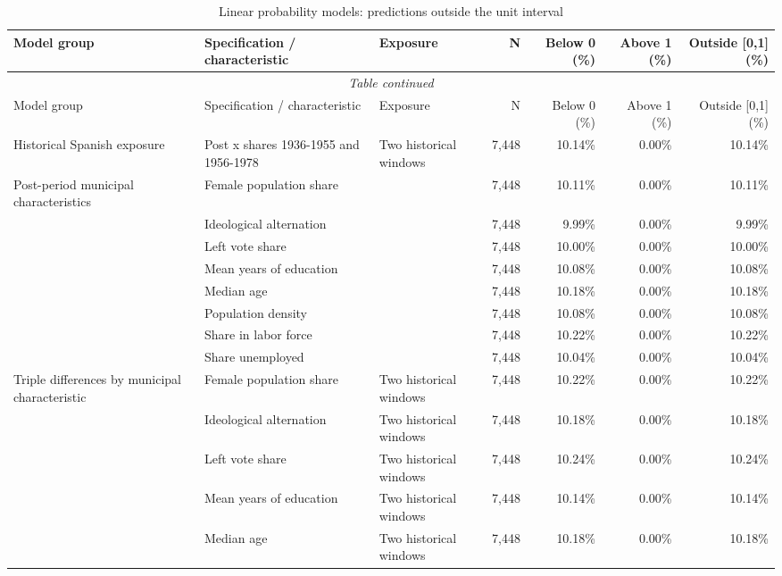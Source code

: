 \scriptsize
\setlength{\tabcolsep}{3pt}
\renewcommand{\arraystretch}{1.12}
\begin{longtable}{p{}p{}p{}rrrr}
\caption{Linear probability models: predictions outside the unit interval}\label{tab:lpm_outside_all_models}\\
\hline
Model group & Specification / characteristic & Exposure & N & Below 0 (\%) & Above 1 (\%) & Outside [0,1] (\%) \\
\hline
\endfirsthead
\multicolumn{7}{c}{\textit{Table continued}} \\
\hline
Model group & Specification / characteristic & Exposure & N & Below 0 (\%) & Above 1 (\%) & Outside [0,1] (\%) \\
\hline
\endhead
Historical Spanish exposure & Post x shares 1936-1955 and 1956-1978 & Two historical windows &        7,448 & 10.14\% &  0.00\% & 10.14\% \\
\addlinespace
Post-period municipal characteristics & Female population share &  &        7,448 & 10.11\% &  0.00\% & 10.11\% \\
 & Ideological alternation &  &        7,448 &  9.99\% &  0.00\% &  9.99\% \\
 & Left vote share &  &        7,448 & 10.00\% &  0.00\% & 10.00\% \\
 & Mean years of education &  &        7,448 & 10.08\% &  0.00\% & 10.08\% \\
 & Median age &  &        7,448 & 10.18\% &  0.00\% & 10.18\% \\
 & Population density &  &        7,448 & 10.08\% &  0.00\% & 10.08\% \\
 & Share in labor force &  &        7,448 & 10.22\% &  0.00\% & 10.22\% \\
 & Share unemployed &  &        7,448 & 10.04\% &  0.00\% & 10.04\% \\
\addlinespace
Triple differences by municipal characteristic & Female population share & Two historical windows &        7,448 & 10.22\% &  0.00\% & 10.22\% \\
 & Ideological alternation & Two historical windows &        7,448 & 10.18\% &  0.00\% & 10.18\% \\
 & Left vote share & Two historical windows &        7,448 & 10.24\% &  0.00\% & 10.24\% \\
 & Mean years of education & Two historical windows &        7,448 & 10.14\% &  0.00\% & 10.14\% \\
 & Median age & Two historical windows &        7,448 & 10.18\% &  0.00\% & 10.18\% \\

\end{longtable}
